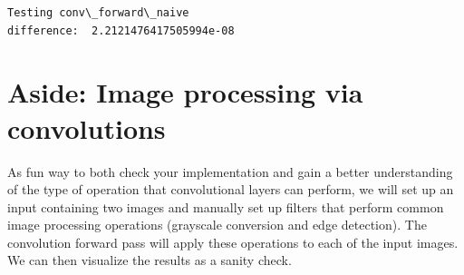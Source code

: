 \documentclass[11pt]{article}
\begin{document}
    \begin{Verbatim}[commandchars=\\\{\}]
Testing conv\_forward\_naive
difference:  2.2121476417505994e-08

    \end{Verbatim}

    \section{Aside: Image processing via
convolutions}\label{aside-image-processing-via-convolutions}

As fun way to both check your implementation and gain a better
understanding of the type of operation that convolutional layers can
perform, we will set up an input containing two images and manually set
up filters that perform common image processing operations (grayscale
conversion and edge detection). The convolution forward pass will apply
these operations to each of the input images. We can then visualize the
results as a sanity check.
\end{document}
